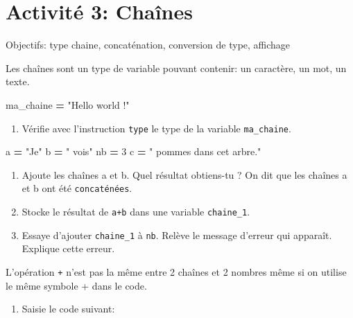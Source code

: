 \documentclass[
]{book}
\newenvironment{Shaded}{\begin{snugshade}}{\end{snugshade}}
\newcommand{\DecValTok}[1]{\textcolor[rgb]{0.00,0.00,0.81}{#1}}
\newcommand{\NormalTok}[1]{#1}
\newcommand{\OperatorTok}[1]{\textcolor[rgb]{0.81,0.36,0.00}{\textbf{#1}}}
\newcommand{\StringTok}[1]{\textcolor[rgb]{0.31,0.60,0.02}{#1}}
\providecommand{\tightlist}{%
  \setlength{\itemsep}{0pt}\setlength{\parskip}{0pt}}
\def\tightlist{}
\begin{document}
\newpage

\hypertarget{activituxe9-3-chauxeenes}{%
\section{Activité 3: Chaînes}\label{activituxe9-3-chauxeenes}}

Objectifs: type chaine, concaténation, conversion de type, affichage

Les chaînes sont un type de variable pouvant contenir: un caractère, un mot, un texte.

\begin{Shaded}
\begin{Highlighting}[]
\NormalTok{ma\_chaine }\OperatorTok{=} \StringTok{"Hello world !"}
\end{Highlighting}
\end{Shaded}

\begin{enumerate}
\def\labelenumi{\arabic{enumi}.}
\tightlist
\item
  Vérifie avec l'instruction \texttt{type} le type de la variable \texttt{ma\_chaine}.
\end{enumerate}

\begin{Shaded}
\begin{Highlighting}[]
\NormalTok{a }\OperatorTok{=} \StringTok{"Je"}
\NormalTok{b }\OperatorTok{=} \StringTok{" vois"}
\NormalTok{nb }\OperatorTok{=} \DecValTok{3}
\NormalTok{c }\OperatorTok{=} \StringTok{" pommes dans cet arbre."}
\end{Highlighting}
\end{Shaded}

\begin{enumerate}
\def\labelenumi{\arabic{enumi}.}
\setcounter{enumi}{1}
\tightlist
\item
  Ajoute les chaînes a et b. Quel résultat obtiens-tu ? On dit que les chaînes a et b ont été \texttt{concaténées}.
\item
  Stocke le résultat de \texttt{a+b} dans une variable \texttt{chaine\_1}.
\item
  Essaye d'ajouter \texttt{chaine\_1} à \texttt{nb}. Relève le message d'erreur qui apparaît. Explique cette erreur.
\end{enumerate}

L'opération \texttt{+} n'est pas la même entre 2 chaînes et 2 nombres même si on utilise le même symbole + dans le code.

\begin{enumerate}
\def\labelenumi{\arabic{enumi}.}
\setcounter{enumi}{4}
\tightlist
\item
  Saisie le code suivant:
\end{enumerate}
\end{document}
